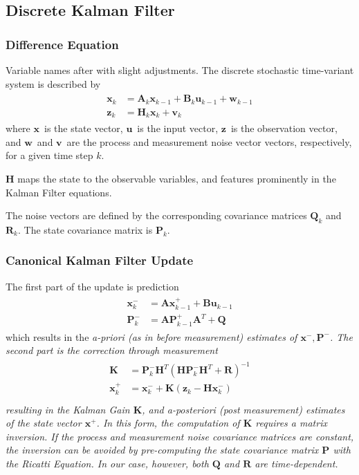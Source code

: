 \documentclass[12pt,a4paper,oneside,openany]{article}
\newcommand{\vx}{\ensuremath{\mathbf{x}}}
\newcommand{\vz}{\ensuremath{\mathbf{z}}}
\newcommand{\vu}{\ensuremath{\mathbf{u}}}
\newcommand{\vv}{\ensuremath{\mathbf{v}}}
\newcommand{\vw}{\ensuremath{\mathbf{w}}}
\newcommand{\mA}{\ensuremath{\mathbf{A}}}
\newcommand{\mB}{\ensuremath{\mathbf{B}}}
\newcommand{\mH}{\ensuremath{\mathbf{H}}}
\newcommand{\mK}{\ensuremath{\mathbf{K}}}
\newcommand{\mP}{\ensuremath{\mathbf{P}}}
\newcommand{\mQ}{\ensuremath{\mathbf{Q}}}
\newcommand{\mR}{\ensuremath{\mathbf{R}}}
\begin{document}
\subsection{Discrete Kalman Filter}

\subsubsection{Difference Equation}

Variable names after \cite{kalman-tut} with slight adjustments. The discrete stochastic time-variant system is described by
\begin{gather}
\begin{aligned}
\vx_k &= \mA_{k} \vx_{k-1} +  \mB_{k} \vu_{k-1} + \vw_{k-1} \\
\vz_k &= \mH_k \vx_k + \vv_k
\end{aligned}
\end{gather}
where \vx\ is the state vector, \vu\ is the input vector, \vz\ is the observation vector, and \vw\ and \vv\ are the process and measurement noise vector vectors, respectively, for a given time step $k$.

$\mH$ maps the state to the observable variables, and features prominently in the Kalman Filter equations.

The noise vectors are defined by the corresponding covariance matrices $\mQ_k$ and $\mR_k$. The state covariance matrix is $\mP_k$.

\subsubsection{Canonical Kalman Filter Update}

The first part of the update is prediction
\begin{gather}
\begin{aligned}
\vx^-_k &= \mA \vx^+_{k-1} +  \mB \vu_{k-1} \\
\mP^-_k &= \mA\mP^+_{k-1}\mA^T + \mQ
\end{aligned}
\end{gather}
which results in the \em a-priori \em (as in before measurement) estimates of $\vx^-, \mP^-$. The second part is the correction through measurement
\begin{gather}
\begin{aligned}
\mK &= \mP^-_k\mH^T\left( \mH \mP^-_k \mH^T + \mR \right)^{-1}\\
\vx^+_k &= \vx^-_k + \mK \left(\vz_k - \mH\vx^-_k \right)\\
\end{aligned}
\end{gather}
resulting in the \em Kalman Gain \em $\mK$, and \em a-posteriori \em (post measurement) estimates of the state vector $\vx^+$. In this form, the computation of $\mK$ requires a matrix inversion. If the process and measurement noise covariance matrices are constant, the inversion can be avoided by pre-computing the state covariance matrix $\mP$ with the Ricatti Equation. In our case, however, both $\mQ$ and $\mR$ are time-dependent.
\end{document}
